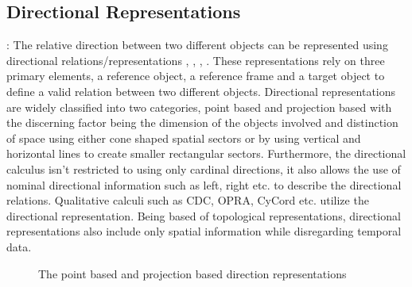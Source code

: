 		\subsection{Directional Representations}: The relative direction between two different objects can be represented using directional relations/representations \cite{cohn1997qualitative}, \cite{chen2015survey}, \cite{cohn2001qualitative}, \cite{cohn2008qualitative}. These representations rely on three primary elements, a reference object, a reference frame and a target object to define a valid relation between two different objects. Directional representations are widely classified into two categories, point based and projection based with the discerning factor being the dimension of the objects involved and distinction of space using either cone shaped spatial sectors or by using vertical and horizontal lines to create smaller rectangular sectors. Furthermore, the directional calculus isn't restricted to using only cardinal directions, it also allows the use of nominal directional information such as left, right etc. to describe the directional relations. Qualitative calculi such as CDC, OPRA, CyCord etc. utilize the directional representation. Being based of topological representations, directional representations also include only spatial information while disregarding temporal data.
		
		\begin{figure}[h!]%
			\centering
			\qquad
			\caption{The point based and projection based direction representations \cite{chen2015survey}}%
			\label{fig:example}%
		\end{figure}
	
